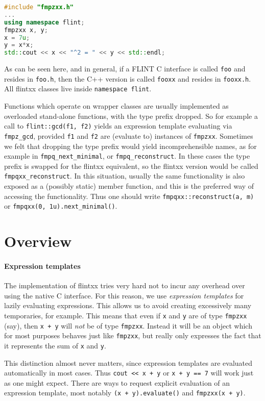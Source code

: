 \documentclass[a4paper,10pt]{book}
\newcommand{\code}{\lstinline}
\begin{document}
{{\begin{lstlisting}[language=c++]
#include "fmpzxx.h"
...
using namespace flint;
fmpzxx x, y;
x = 7u;
y = x*x;
std::cout << x << "^2 = " << y << std::endl;
\end{lstlisting}

As can be seen here, and in general, if a FLINT C interface is called \code{foo}
and resides in \code{foo.h}, then the C++ version is called \code{fooxx} and
resides in \code{fooxx.h}. All flintxx classes live inside
\code{namespace flint}.

Functions which operate on wrapper classes are usually implemented as overloaded
stand-alone functions, with the type prefix dropped. So for example a call to
\code{flint::gcd(f1, f2)} yields an expression template evaluating via
\code{fmpz_gcd}, provided \code{f1} and \code{f2} are (evaluate to) instances of
\code{fmpzxx}. Sometimes we felt that dropping the type prefix would yield
incomprehensible names, as for example in \code{fmpq_next_minimal}, or
\code{fmpq_reconstruct}. In these cases the type prefix is swapped for the
flintxx equivalent, so the flintxx version would be called
\code{fmpqxx_reconstruct}. In this situation, usually the same functionality is
also exposed as a (possibly static) member function, and this is the preferred
way of accessing the functionality. Thus one should write
\code{fmpqxx::reconstruct(a, m)} or \code{fmpqxx(0, 1u).next_minimal()}.

\section{Overview}

\paragraph{Expression templates}
The implementation of flintxx tries very hard not to incur any overhead over
using the native C interface. For this reason, we use \emph{expression
templates} for lazily evaluating expressions. This allows us to avoid creating
excessively many temporaries, for example. This means that even if \code{x} and
\code{y} are of type \code{fmpzxx} (say), then \code{x + y} will \emph{not} be
of type \code{fmpzxx}. Instead it will be an object which for most purposes
behaves just like \code{fmpzxx}, but really only expresses the fact that it
represents the sum of \code{x} and \code{y}.

This distinction almost never matters, since expression templates are evaluated
automatically in most cases. Thus \code{cout << x + y} or \code{x + y == 7} will
work just as one might expect. There are ways to request explicit evaluation of
an expression template, most notably \code{(x + y).evaluate()} and
\code{fmpzxx(x + y)}.

}}
\end{document}
